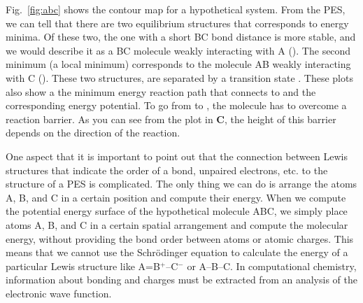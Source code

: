 \documentclass[../Main/chem371-notes.tex]{subfiles}
\begin{document}
Fig.~\ref{fig:abc} shows the contour map for a hypothetical  system.
From the PES, we can tell that there are two equilibrium structures that corresponds to energy minima.
Of these two, the one with a short BC bond distance is more stable, and we would describe it as a BC molecule weakly interacting with A ().
The second minimum (a local minimum) corresponds to the molecule AB weakly interacting with C ().
These two structures, are separated by a transition state .
These plots also show a the minimum energy reaction path that connects  to  and the corresponding energy potential.
To go from  to , the molecule has to overcome a reaction barrier.
As you can see from the plot in \textbf{C}, the height of this barrier depends on the direction of the reaction.

One aspect that it is important to point out that the connection between Lewis structures that indicate the order of a bond, unpaired electrons, etc. to the structure of a PES is complicated.
 The only thing we can do is arrange the atoms A, B, and C in a certain position and compute their energy.
When we compute the potential energy surface of the hypothetical molecule ABC, we simply place atoms A, B, and C in a certain spatial arrangement and compute the molecular energy, without providing the bond order between atoms or atomic charges.
This means that we cannot use the Schr\"{o}dinger equation to calculate the energy of a particular Lewis structure like A=B$^+$--C$^-$ or A--B--C.
In computational chemistry, information about bonding and charges must be extracted from an analysis of the electronic wave function.
\end{document}

